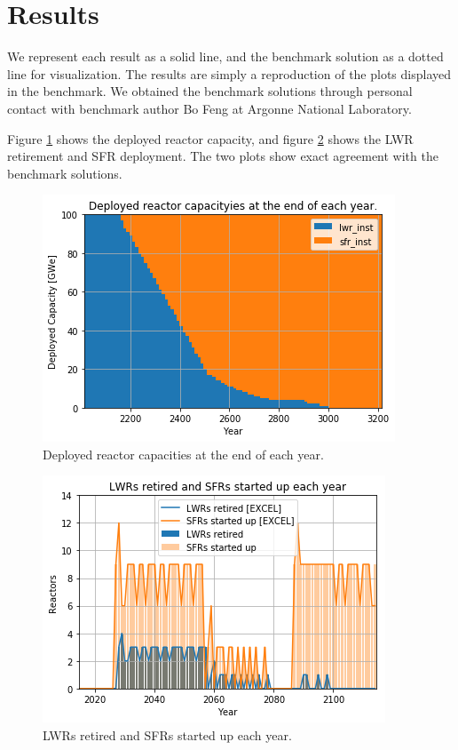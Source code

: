 \section{Results}

We represent each \Cyclus result as a solid line, and the benchmark solution
as a dotted line for visualization. The results are
simply a reproduction of the plots displayed in the benchmark. 
We obtained the benchmark solutions through personal contact with
benchmark author Bo Feng at Argonne National Laboratory.


Figure \ref{fig:pow_plot} shows the deployed reactor capacity, and
figure \ref{fig:dep} shows the \gls{LWR} retirement and \gls{SFR}
deployment. The two plots show exact agreement with the
benchmark solutions.

\begin{figure}[htbp!]
	\begin{center}
		\includegraphics[scale=0.5]{./images/results_18/power_plot.png}
	\end{center}
        \caption{Deployed reactor capacities at the end of each year.}
	\label{fig:pow_plot}
\end{figure}



\begin{figure}[htbp!]
	\begin{center}
		\includegraphics[scale=0.5]{./images/results_18/dep.png}
	\end{center}
        \caption{\glspl{LWR} retired and \glspl{SFR} started up each year.}
	\label{fig:dep}
\end{figure}

